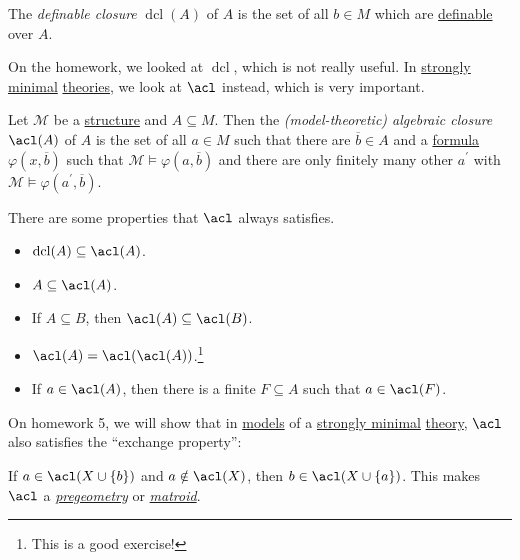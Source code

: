 \begin{prev}
	The \emph{definable closure} \(\mathop{\mathrm{dcl}}(A) \) of \(A\) is the set of all \(b\in M\) which are \hyperref[def:definable]{definable} over \(A\).
\end{prev}

On the homework, we looked at \(\mathop{\mathrm{dcl}}\), which is not really useful. In \hyperref[def:strongly-minimal]{strongly minimal} \hyperref[def:theory]{theories}, we look at \(\acl \) instead, which is very important.

\begin{definition}\label{def:model-algebraic-closure}
	Let \(\mathcal{M} \) be a \hyperref[def:structure]{structure} and \(A \subseteq M\). Then the \emph{(model-theoretic) algebraic closure} \(\acl(A) \) of \(A\) is the set of all \(a\in M\) such that there are \(\overline{b} \in A\) and a \hyperref[def:formula]{formula} \(\varphi (x, \overline{b} )\) such that \(\mathcal{M} \models \varphi (a, \overline{b} )\) and there are only finitely many other \(a^{\prime} \) with \(\mathcal{M} \models \varphi (a^{\prime} , \overline{b} )\).
\end{definition}

\begin{note}
	There are some properties that \(\acl \) always satisfies.
	\begin{itemize}
		\item \(\mathop{\mathrm{dcl}}(A) \subseteq \acl(A) \).
		\item \(A \subseteq \acl(A) \).
		\item If \(A \subseteq B\), then \(\acl(A) \subseteq \acl(B) \).
		\item \(\acl(A) = \acl(\acl(A)) \).\footnote{This is a good exercise!}
		\item If \(a\in \acl(A) \), then there is a finite \(F \subseteq A\) such that \(a\in \acl(F) \).
	\end{itemize}
\end{note}

On homework 5, we will show that in \hyperref[def:model]{models} of a \hyperref[def:strongly-minimal]{strongly minimal} \hyperref[def:theory]{theory}, \(\acl\) also satisfies the ``exchange property'':

\begin{remark}
	If \(a\in \acl(X \cup \left\{ b \right\}) \) and \(a \notin \acl(X) \), then \(b\in \acl(X \cup \left\{ a \right\}) \). This makes \(\acl \) a \href{https://en.wikipedia.org/wiki/Pregeometry_(model_theory)}{\emph{pregeometry}} or \href{https://en.wikipedia.org/wiki/Matroid}{\emph{matroid}}.
\end{remark}

